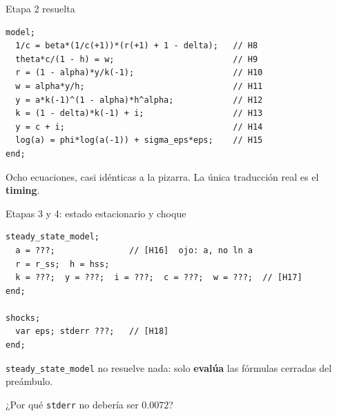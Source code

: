 \begin{frame}[fragile,label=etapa2-sol]{Etapa 2 resuelta}
  \begin{lstlisting}
model;
  1/c = beta*(1/c(+1))*(r(+1) + 1 - delta);   // H8
  theta*c/(1 - h) = w;                        // H9
  r = (1 - alpha)*y/k(-1);                    // H10
  w = alpha*y/h;                              // H11
  y = a*k(-1)^(1 - alpha)*h^alpha;            // H12
  k = (1 - delta)*k(-1) + i;                  // H13
  y = c + i;                                  // H14
  log(a) = phi*log(a(-1)) + sigma_eps*eps;    // H15
end;
\end{lstlisting}
  \vspace{0.2cm}
  Ocho ecuaciones, casi idénticas a la pizarra. La única traducción real es el
  \textbf{timing}.
\end{frame}

\begin{frame}[fragile,label=etapa34]{Etapas 3 y 4: estado estacionario y choque}
  \begin{lstlisting}
steady_state_model;
  a = ???;               // [H16]  ojo: a, no ln a
  r = r_ss;  h = hss;
  k = ???;  y = ???;  i = ???;  c = ???;  w = ???;  // [H17]
end;

shocks;
  var eps; stderr ???;   // [H18]
end;
\end{lstlisting}
  \vspace{0.2cm}
  \texttt{steady\_state\_model} no resuelve nada: solo \textbf{evalúa} las fórmulas
  cerradas del preámbulo.\par
  \vspace{0.25cm}
  ¿Por qué \texttt{stderr} no debería ser $0.0072$?
\end{frame}

